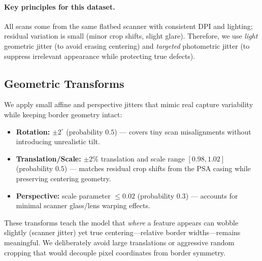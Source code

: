 \documentclass[12pt]{article}
\begin{document}
\paragraph{Key principles for this dataset.}
All scans come from the same flatbed scanner with consistent DPI and lighting; residual variation is small (minor crop shifts, slight glare). 
Therefore, we use \emph{light} geometric jitter (to avoid erasing centering) and \emph{targeted} photometric jitter (to suppress irrelevant appearance while protecting true defects).

\subsection{Geometric Transforms}
\label{subsec:aug-geom}
We apply small affine and perspective jitters that mimic real capture variability while keeping border geometry intact:
\begin{itemize}
  \item \textbf{Rotation:} $\pm 2^\circ$ (probability $0.5$) — covers tiny scan misalignments without introducing unrealistic tilt.
  \item \textbf{Translation/Scale:} $\pm 2\%$ translation and scale range $[0.98, 1.02]$ (probability $0.5$) — matches residual crop shifts from the PSA casing while preserving centering geometry.
  \item \textbf{Perspective:} scale parameter $\le 0.02$ (probability $0.3$) — accounts for minimal scanner glass/lens warping effects.
\end{itemize}
These transforms teach the model that \emph{where} a feature appears can wobble slightly (scanner jitter) yet true centering—relative border widths—remains meaningful. We deliberately avoid large translations or aggressive random cropping that would decouple pixel coordinates from border symmetry.
\end{document}
